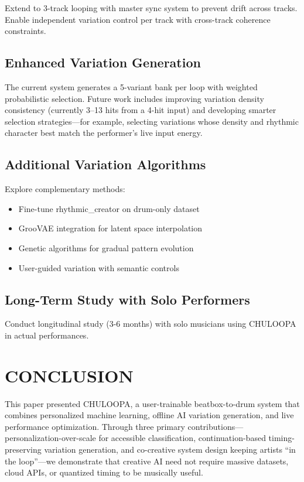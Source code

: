\documentclass{aimc2026}
\begin{document}
Extend to 3-track looping with master sync system to prevent drift across tracks. Enable independent variation control per track with cross-track coherence constraints.

\subsection{Enhanced Variation Generation}

The current system generates a 5-variant bank per loop with weighted probabilistic selection. Future work includes improving variation density consistency (currently 3--13 hits from a 4-hit input) and developing smarter selection strategies---for example, selecting variations whose density and rhythmic character best match the performer's live input energy.

\subsection{Additional Variation Algorithms}

Explore complementary methods:
\begin{itemize}
\item Fine-tune rhythmic\_creator on drum-only dataset
\item GrooVAE integration for latent space interpolation
\item Genetic algorithms for gradual pattern evolution
\item User-guided variation with semantic controls
\end{itemize}

\subsection{Long-Term Study with Solo Performers}

Conduct longitudinal study (3-6 months) with solo musicians using CHULOOPA in actual performances.


\section{CONCLUSION}
\label{sec:conclusion}

This paper presented CHULOOPA, a user-trainable beatbox-to-drum system that combines personalized machine learning, offline AI variation generation, and live performance optimization. Through three primary contributions---personalization-over-scale for accessible classification, continuation-based timing-preserving variation generation, and co-creative system design keeping artists ``in the loop''---we demonstrate that creative AI need not require massive datasets, cloud APIs, or quantized timing to be musically useful.
\end{document}
